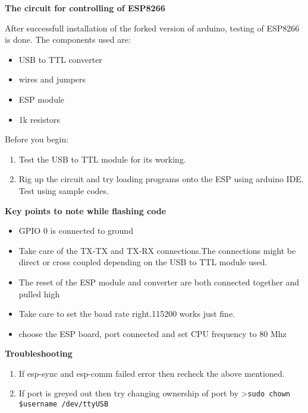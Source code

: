 \documentclass[16pt]{article}
\begin{document}
\begin{enumerate}

{\Large{\item{\textbf{The circuit for controlling of ESP8266}}}}

\vspace{0.5cm}

After successfull installation of the forked version of arduino, testing
of ESP8266 is done. The components used are:

\begin{itemize}

\item
  USB to TTL converter
\item
  wires and jumpers
\item
  ESP module
\item
  1k resistors
\end{itemize}

Before you begin:

\begin{enumerate}

\item
  Test the USB to TTL module for its working.
\item
  Rig up the circuit and try loading programs onto the ESP using arduino
  IDE. Test using sample codes.
\end{enumerate}

\textbf{Key points to note while flashing code}

\begin{itemize}

\item
  GPIO 0 is connected to ground
\item
  Take care of the TX-TX and TX-RX connections.The connections might be
  direct or cross coupled depending on the USB to TTL module used.
\item
  The reset of the ESP module and converter are both connected together
  and pulled high
\item
  Take care to set the baud rate right.115200 works just fine.
\item
  choose the ESP board, port connected and set CPU frequency to 80 Mhz
\end{itemize}

\vspace{0.5cm}
{\Large{\textbf{Troubleshooting}}}

\begin{enumerate}

\item
  If esp-sync and esp-comm failed error then recheck the above
  mentioned.
\item
  If port is greyed out then try changing ownership of port by
  \textgreater{}\texttt{sudo chown \$username /dev/ttyUSB}
\end{enumerate}


\end{enumerate}
\end{document}
